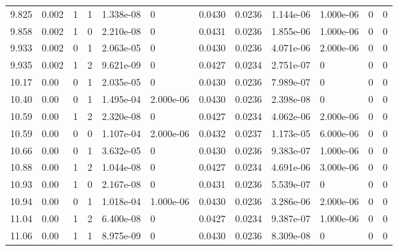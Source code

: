 \documentclass[preview]{standalone}
\begin{document}
{{{\begin{tabular}{L{1.2cm}C{1.2cm} C{0.3cm}C{0.5cm} C{1.4cm}C{1.4cm} C{1.4cm}C{1.4cm} C{1.6cm}C{1.6cm} C{1.6cm}C{1.6cm}}
  9.825  &  0.002  & 1     &  1 &  1.338e-08  & 0  &  0.0430&   0.0236& 1.144e-06 & 1.000e-06   &  0 & 0  \\ 
  9.858  &  0.002  & 1     &  0 &  2.210e-08  & 0  &  0.0431&   0.0236& 1.855e-06 & 1.000e-06   &  0 & 0  \\ 
  9.933  &  0.002  & 0     &  1 &  2.063e-05  & 0  &  0.0430&   0.0236& 4.071e-06 & 2.000e-06   &  0 & 0  \\ 
  9.935  &  0.002  & 1     &  2 &  9.621e-09  & 0  &  0.0427&   0.0234& 2.751e-07 & 0   &  0 & 0  \\ 
  10.17  &  0.00  & 0     &  1 &  2.035e-05  & 0  &  0.0430&   0.0236& 7.989e-07 & 0   &  0 & 0  \\ 
  10.40  &  0.00  & 0     &  1 &  1.495e-04  & 2.000e-06  &  0.0430&   0.0236& 2.398e-08 & 0   &  0 & 0  \\ 
  10.59  &  0.00  & 1     &  2 &  2.320e-08  & 0  &  0.0427&   0.0234& 4.062e-06 & 2.000e-06   &  0 & 0  \\ 
  10.59  &  0.00  & 0     &  0 &  1.107e-04  & 2.000e-06  &  0.0432&   0.0237& 1.173e-05 & 6.000e-06   &  0 & 0  \\ 
  10.66  &  0.00  & 0     &  1 &  3.632e-05  & 0  &  0.0430&   0.0236& 9.383e-07 & 1.000e-06   &  0 & 0  \\ 
  10.88  &  0.00  & 1     &  2 &  1.044e-08  & 0  &  0.0427&   0.0234& 4.691e-06 & 3.000e-06   &  0 & 0  \\ 
  10.93  &  0.00  & 1     &  0 &  2.167e-08  & 0  &  0.0431&   0.0236& 5.539e-07 & 0   &  0 & 0  \\ 
  10.94  &  0.00  & 0     &  1 &  1.018e-04  & 1.000e-06  &  0.0430&   0.0236& 3.286e-06 & 2.000e-06   &  0 & 0  \\ 
  11.04  &  0.00  & 1     &  2 &  6.400e-08  & 0  &  0.0427&   0.0234& 9.387e-07 & 1.000e-06   &  0 & 0  \\ 
  11.06  &  0.00  & 1     &  1 &  8.975e-09  & 0  &  0.0430&   0.0236& 8.309e-08 & 0   &  0 & 0  \\ 
\hline 
\end{tabular} 

}}}
\end{document}
